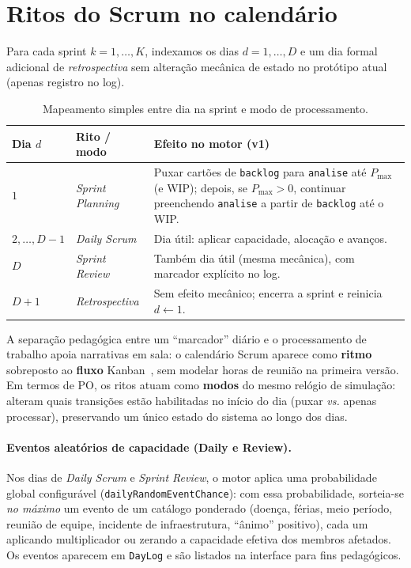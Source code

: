 \section{Ritos do Scrum no calendário}
\label{sec:ritos}

Para cada sprint $k=1,\dots,K$, indexamos os dias $d=1,\dots,D$ e um dia formal adicional de \emph{retrospectiva} sem alteração mecânica de estado no protótipo atual (apenas registro no log).

\begin{table}[htbp]
  \centering
  \caption{Mapeamento simples entre dia na sprint e modo de processamento.}
  \label{tab:ritos}
  \begin{tabular}{@{}llp{7.2cm}@{}}
    \toprule
    Dia $d$ & Rito / modo & Efeito no motor (v1) \\
    \midrule
    $1$ & \emph{Sprint Planning} & Puxar cartões de \texttt{backlog} para \texttt{analise} até $P_{\max}$ (e WIP); depois, se $P_{\max}>0$, continuar preenchendo \texttt{analise} a partir de \texttt{backlog} até o WIP. \\
    $2,\dots,D-1$ & \emph{Daily Scrum} & Dia útil: aplicar capacidade, alocação e avanços. \\
    $D$ & \emph{Sprint Review} & Também dia útil (mesma mecânica), com marcador explícito no log. \\
    $D{+}1$ & \emph{Retrospectiva} & Sem efeito mecânico; encerra a sprint e reinicia $d\leftarrow 1$. \\
    \bottomrule
  \end{tabular}
\end{table}

A separação pedagógica entre um ``marcador'' diário e o processamento de trabalho apoia narrativas em sala: o calendário Scrum aparece como \textbf{ritmo} sobreposto ao \textbf{fluxo} Kanban~\cite{schwaber2002agile,schwaber2020scrum}, sem modelar horas de reunião na primeira versão. Em termos de PO, os ritos atuam como \textbf{modos} do mesmo relógio de simulação: alteram quais transições estão habilitadas no início do dia (puxar \emph{vs.} apenas processar), preservando um único estado do sistema ao longo dos dias.

\paragraph{Eventos aleatórios de capacidade (Daily e Review).}
Nos dias de \emph{Daily Scrum} e \emph{Sprint Review}, o motor aplica uma probabilidade global configurável (\texttt{dailyRandomEventChance}): com essa probabilidade, sorteia-se \emph{no máximo} um evento de um catálogo ponderado (doença, férias, meio período, reunião de equipe, incidente de infraestrutura, ``ânimo'' positivo), cada um aplicando multiplicador ou zerando a capacidade efetiva dos membros afetados. Os eventos aparecem em \texttt{DayLog} e são listados na interface para fins pedagógicos.
